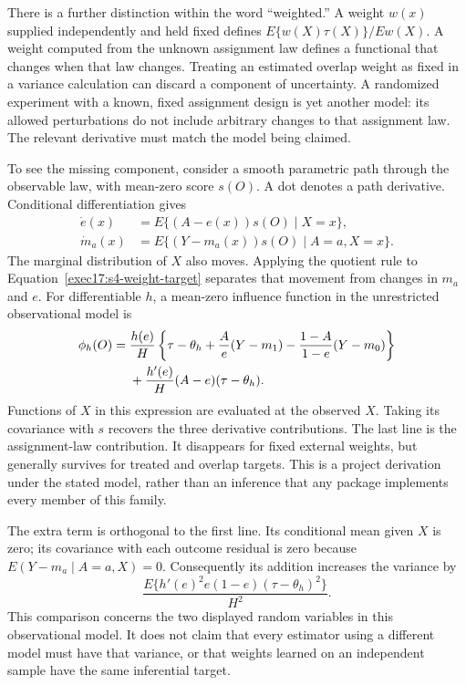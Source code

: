 There is a further distinction within the word ``weighted.'' A weight
$w(x)$ supplied independently and held fixed defines
$E\{w(X)\tau(X)\}/Ew(X)$. A weight computed from the unknown assignment law
defines a functional that changes when that law changes. Treating an estimated
overlap weight as fixed in a variance calculation can discard a component of
uncertainty. A randomized experiment with a known, fixed assignment design is
yet another model: its allowed perturbations do not include arbitrary changes
to that assignment law. The relevant derivative must match the model being
claimed.~\citep{exec17_s4_math,dml2018}

To see the missing component, consider a smooth parametric path through the
observable law, with mean-zero score $s(O)$. A dot denotes a path derivative.
Conditional differentiation gives
\begin{align*}
 \dot e(x)&=E\{(A-e(x))s(O)\mid X=x\},\\
 \dot m_a(x)&=E\{(Y-m_a(x))s(O)\mid A=a,X=x\}.
\end{align*}
The marginal distribution of $X$ also moves. Applying the quotient rule to
Equation~\eqref{exec17:s4-weight-target} separates that movement from changes
in $m_a$ and $e$. For differentiable $h$, a mean-zero influence function in
the unrestricted observational model is
\begin{align}
 \phi_h(O)={}&\frac{h(e)}{H}
 \left\{\tau-\theta_h+\frac{A}{e}(Y-m_1)
                 -\frac{1-A}{1-e}(Y-m_0)\right\}\notag\\
 &+\frac{h'(e)}{H}(A-e)(\tau-\theta_h).
 \label{exec17:s4-weight-if}
\end{align}
Functions of $X$ in this expression are evaluated at the observed $X$.
Taking its covariance with $s$ recovers the three derivative contributions.
The last line is the assignment-law contribution. It disappears for fixed
external weights, but generally survives for treated and overlap targets.
This is a project derivation under the stated model, rather than an inference
that any package implements every member of this family.~\citep{exec17_s4_math}

The extra term is orthogonal to the first line. Its conditional mean given
$X$ is zero; its covariance with each outcome residual is zero because
$E(Y-m_a\mid A=a,X)=0$. Consequently its addition increases the variance by
\begin{equation}
 \frac{E\{h'(e)^2e(1-e)(\tau-\theta_h)^2\}}{H^2}.
 \label{exec17:s4-extra-variance}
\end{equation}
This comparison concerns the two displayed random variables in this
observational model. It does not claim that every estimator using a different
model must have that variance, or that weights learned on an independent
sample have the same inferential target.

